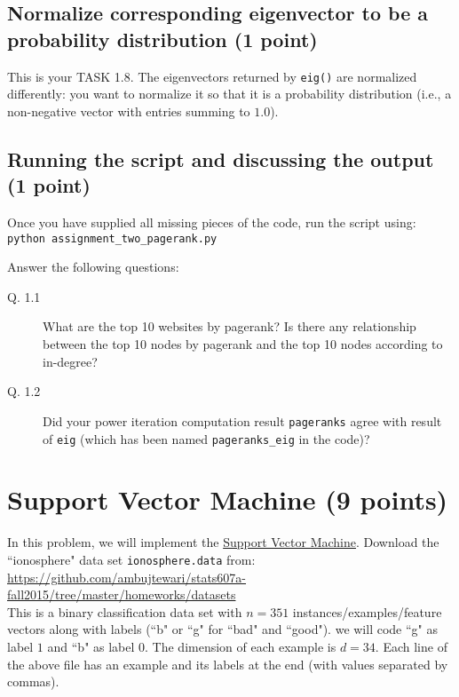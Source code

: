 \documentclass{article}
\begin{document}
\subsection{Normalize corresponding eigenvector to be a probability distribution (1 point)}

This is your TASK 1.8. The eigenvectors returned by {\tt eig()} are normalized differently: you want to normalize it so that it is a probability distribution (i.e.,
a non-negative vector with entries summing to $1.0$).

\subsection{Running the script and discussing the output (1 point)}

Once you have supplied all missing pieces of the code, run the script using:\\
{\tt python assignment\_two\_pagerank.py}

Answer the following questions:
\begin{description}
\item[Q. 1.1]
What are the top 10 websites by pagerank? Is there any relationship between the top 10 nodes by pagerank and the top 10 nodes according to in-degree?
\item[Q. 1.2]
Did your power iteration computation result {\tt pageranks} agree with result of {\tt eig} (which has been named {\tt pageranks\_eig} in the code)?
\end{description}


\section{Support Vector Machine (9 points)}


In this problem, we will implement the \href{http://en.wikipedia.org/wiki/Support\_vector\_machine}{Support Vector Machine}.
Download the ``ionosphere" data set {\tt ionosphere.data} from:\\
\url{https://github.com/ambujtewari/stats607a-fall2015/tree/master/homeworks/datasets} \\
This is a binary classification data set with $n=351$ instances/examples/feature vectors along with labels (``b" or ``g" for ``bad" and ``good"). we will code ``g"
as label $1$ and ``b" as label $0$.
The dimension of each example is $d=34$. Each line of the above file has an example and its labels at the end (with values separated by commas).
\end{document}
